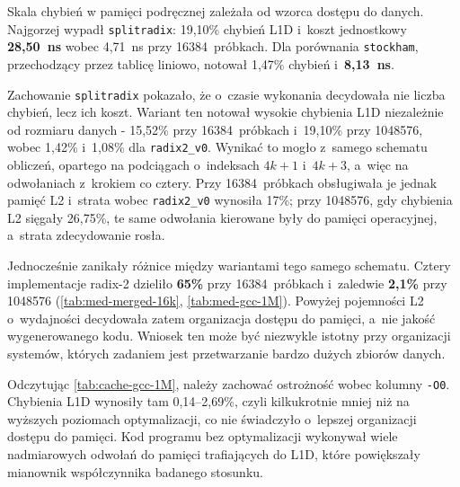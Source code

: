 Skala chybień w pamięci podręcznej zależała od wzorca dostępu do danych. Najgorzej wypadł
\texttt{splitradix}: 19,10\% chybień L1D i~koszt jednostkowy \textbf{28,50~ns} wobec
4,71~ns przy 16384~próbkach. Dla porównania \texttt{stockham}, przechodzący
przez tablicę liniowo, notował 1,47\% chybień i~\textbf{8,13~ns}.

Zachowanie \texttt{splitradix} pokazało, że o~czasie wykonania decydowała nie liczba chybień,
lecz ich koszt. Wariant ten notował wysokie chybienia L1D niezależnie od rozmiaru
danych - 15,52\% przy 16384~próbkach i~19,10\% przy 1048576, wobec 1,42\%
i~1,08\% dla \texttt{radix2\_v0}. Wynikać to mogło z~samego schematu obliczeń,
opartego na podciągach o~indeksach $4k+1$ i~$4k+3$, a~więc na odwołaniach
z~krokiem co cztery. Przy 16384~próbkach obsługiwała je jednak pamięć L2 i~strata
wobec \texttt{radix2\_v0} wynosiła 17\%; przy 1048576, gdy chybienia L2 sięgały
26,75\%, te same odwołania kierowane były do pamięci operacyjnej, a~strata zdecydowanie rosła.

Jednocześnie zanikały różnice między wariantami tego samego schematu. Cztery
implementacje radix-2 dzieliło \textbf{65\%} przy 16384~próbkach i~zaledwie \textbf{2,1\%} przy
1048576 (\cref{tab:med-merged-16k}, \cref{tab:med-gcc-1M}). Powyżej pojemności
L2 o~wydajności decydowała zatem organizacja dostępu do pamięci, a~nie jakość
wygenerowanego kodu. Wniosek ten może być niezwykle istotny przy organizacji systemów, których zadaniem jest przetwarzanie
bardzo dużych zbiorów danych.

Odczytując \cref{tab:cache-gcc-1M}, należy zachować ostrożność wobec kolumny
\texttt{-O0}. Chybienia L1D wynosiły tam 0,14--2,69\%, czyli kilkukrotnie mniej
niż na wyższych poziomach optymalizacji, co nie świadczyło o~lepszej organizacji dostępu do pamięci.
Kod programu bez optymalizacji wykonywał wiele nadmiarowych odwołań do pamięci trafiających
do L1D, które powiększały mianownik współczynnika badanego stosunku.

